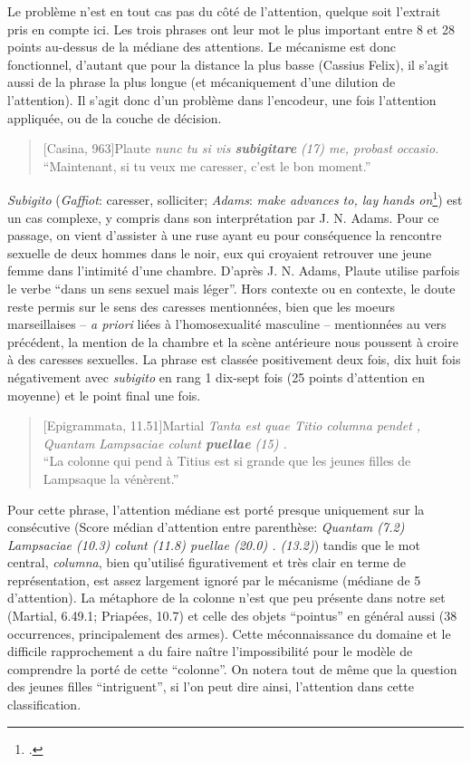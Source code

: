Le problème n'est en tout cas pas du côté de l'attention, quelque soit l'extrait pris en compte ici. Les trois phrases ont leur mot le plus important entre 8 et 28 points au-dessus de la médiane des attentions. Le mécanisme est donc fonctionnel, d'autant que pour la distance la plus basse (Cassius Felix), il s'agit aussi de la phrase la plus longue (et mécaniquement d'une dilution de l'attention). Il s'agit donc d'un problème dans l'encodeur, une fois l'attention appliquée, ou de la couche de décision.


\begin{quote}[Casina, 963]{Plaute}
    \textit{nunc tu si vis \textbf{subigitare} (17) me, probast occasio.} \\
    \enquote{Maintenant, si tu veux me caresser, c'est le bon moment.}
\end{quote}

\textit{Subigito} (\textit{Gaffiot}: caresser, solliciter; \textit{Adams}: \textit{make advances to, lay hands on}\footcite[p. 323]{adams_prostiute}) est un cas complexe, y compris dans son interprétation par J. N. Adams. Pour ce passage, on vient d'assister à une ruse ayant eu pour conséquence la rencontre sexuelle de deux hommes dans le noir, eux qui croyaient retrouver une jeune femme dans l'intimité d'une chambre. D'après J. N. Adams, Plaute utilise parfois le verbe ``dans un sens sexuel mais léger''. Hors contexte ou en contexte, le doute reste permis sur le sens des caresses mentionnées, bien que les moeurs marseillaises -- \textit{a priori} liées à l'homosexualité masculine -- mentionnées au vers précédent, la mention de la chambre et la scène antérieure nous poussent à croire à des caresses sexuelles. La phrase est classée positivement deux fois, dix huit fois négativement avec \textit{subigito} en rang 1 dix-sept fois (25 points d'attention en moyenne) et le point final une fois.


% 
\begin{quote}[Epigrammata, 11.51]{Martial}
\textit{Tanta est quae Titio columna pendet , Quantam Lampsaciae colunt \textbf{puellae} (15) .}\\
\enquote{La colonne qui pend à Titius est si grande que les jeunes filles de Lampsaque la vénèrent.}
\end{quote}

Pour cette phrase, l'attention médiane est porté presque uniquement sur la consécutive (Score médian d'attention entre parenthèse: \textit{Quantam (7.2) Lampsaciae (10.3) colunt (11.8) puellae (20.0) . (13.2)}) tandis que le mot central, \textit{columna}, bien qu'utilisé figurativement et très clair en terme de représentation, est assez largement ignoré par le mécanisme (médiane de 5 d'attention). La métaphore de la colonne n'est que peu présente dans notre set (Martial, 6.49.1; Priapées, 10.7) et celle des objets ``pointus'' en général aussi (38 occurrences, principalement des armes). Cette méconnaissance du domaine et le difficile rapprochement a du faire naître l'impossibilité pour le modèle de comprendre la porté de cette ``colonne''. On notera  tout de même que la question des jeunes filles ``intriguent'', si l'on peut dire ainsi, l'attention dans cette classification.

